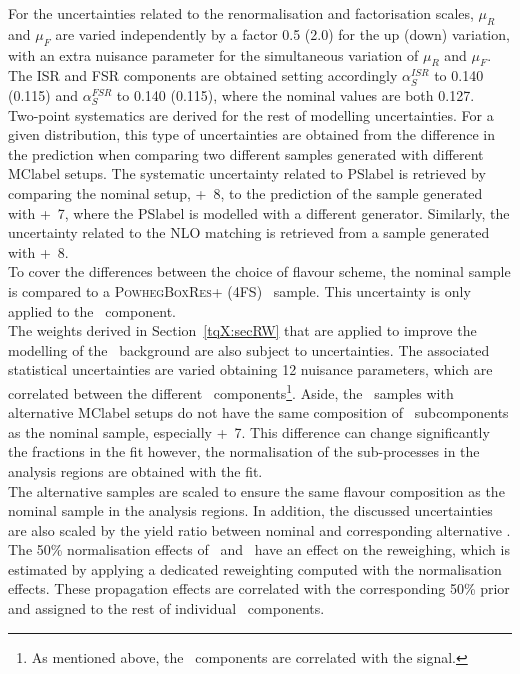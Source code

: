For the uncertainties related to the renormalisation and factorisation scales, $\mu_R$ and $\mu_F$ are varied independently by a factor 0.5 (2.0) for the up (down) variation, with an extra nuisance parameter for the simultaneous variation of $\mu_R$ and $\mu_F$. The ISR and FSR components are obtained setting accordingly $\alpha_S^{ISR}$ to 0.140 (0.115) and $\alpha_S^{FSR}$ to 0.140 (0.115), where the nominal values are both 0.127.\\

Two-point systematics are derived for the rest of modelling uncertainties. For a given distribution, this type of uncertainties are obtained from the difference in the prediction when comparing two different samples generated with different \acrshort{MClabel} setups. The systematic uncertainty related to \acrshort{PSlabel} is retrieved by comparing the nominal setup, \POWHEGBOX+\PYTHIA~8, to the prediction of the sample generated with \POWHEGBOX+\HERWIG~7, where the \acrshort{PSlabel} is modelled with a different generator. Similarly, the uncertainty related to the NLO matching is retrieved from a sample generated with \MGMCatNLO+\PYTHIA~8.\\

To cover the differences between the choice of flavour scheme, the nominal sample is compared to a \textsc{PowhegBoxRes}+ (4FS) \ttb\ sample. This uncertainty is only applied to the \ttb\ component.\\

The weights derived in Section~\ref{tqX:secRW} that are applied to improve the modelling of the \ttbar\ background are also subject to uncertainties. The associated statistical uncertainties are varied obtaining 12 nuisance parameters, which are correlated between the different \ttbar\ components\footnote{As mentioned above, the \ttl\ components are correlated with the signal.}. Aside, the \ttbar\ samples with alternative \acrshort{MClabel} setups do not have the same composition of \ttbar\ subcomponents as the nominal sample, especially \POWHEGBOX+\HERWIG~7. This difference can change significantly the fractions in the fit however, the normalisation of the sub-processes in the analysis regions are obtained with the fit.\\

The alternative samples are scaled to ensure the same flavour composition as the nominal sample in the analysis regions. In addition, the discussed uncertainties are also scaled by the yield ratio between nominal and corresponding alternative \ttbar. The 50\% normalisation effects of \ttb\ and \ttc\ have an effect on the reweighing, which is estimated by applying a dedicated reweighting computed with the normalisation effects. These propagation effects are correlated with the corresponding 50\% prior and assigned to the rest of individual \ttbar\ components.

